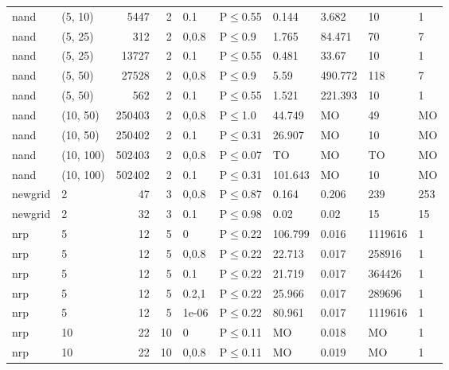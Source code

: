 \begin{longtable}{llrrllllll}
 nand          & (5, 10)   &   	5447 &   2 & 0.1   & P$\leq$0.55  & 0.144   & 3.682   & 10      & 1    \\
 nand          & (5, 25)   &    	312 &   2 & 0,0.8 & P$\leq$0.9   & 1.765   & 84.471  & 70      & 7    \\
 nand          & (5, 25)   &  	13727 &   2 & 0.1   & P$\leq$0.55  & 0.481   & 33.67   & 10      & 1    \\
 nand          & (5, 50)   &  	27528 &   2 & 0,0.8 & P$\leq$0.9   & 5.59    & 490.772 & 118     & 7    \\
 nand          & (5, 50)   &    	562 &   2 & 0.1   & P$\leq$0.55  & 1.521   & 221.393 & 10      & 1    \\
 nand          & (10, 50)  & 	250403 &   2 & 0,0.8 & P$\leq$1.0   & 44.749  & MO      & 49      & MO   \\
 nand          & (10, 50)  & 	250402 &   2 & 0.1   & P$\leq$0.31  & 26.907  & MO      & 10      & MO   \\
 nand          & (10, 100) & 	502403 &   2 & 0,0.8 & P$\leq$0.07  & TO      & MO      & TO      & MO   \\
 nand          & (10, 100) & 	502402 &   2 & 0.1   & P$\leq$0.31  & 101.643 & MO      & 10      & MO   \\
 newgrid       & 2         &     	47 &   3 & 0,0.8 & P$\leq$0.87  & 0.164   & 0.206   & 239     & 253  \\
 newgrid       & 2         &     	32 &   3 & 0.1   & P$\leq$0.98  & 0.02    & 0.02    & 15      & 15   \\
 nrp           & 5         &     	12 &   5 & 0     & P$\leq$0.22  & 106.799 & 0.016   & 1119616 & 1    \\
 nrp           & 5         &     	12 &   5 & 0,0.8 & P$\leq$0.22  & 22.713  & 0.017   & 258916  & 1    \\
 nrp           & 5         &     	12 &   5 & 0.1   & P$\leq$0.22  & 21.719  & 0.017   & 364426  & 1    \\
 nrp           & 5         &     	12 &   5 & 0.2,1 & P$\leq$0.22  & 25.966  & 0.017   & 289696  & 1    \\
 nrp           & 5         &     	12 &   5 & 1e-06 & P$\leq$0.22  & 80.961  & 0.017   & 1119616 & 1    \\
 nrp           & 10        &     	22 &  10 & 0     & P$\leq$0.11  & MO      & 0.018   & MO      & 1    \\
 nrp           & 10        &     	22 &  10 & 0,0.8 & P$\leq$0.11  & MO      & 0.019   & MO      & 1    \\

\end{longtable}

